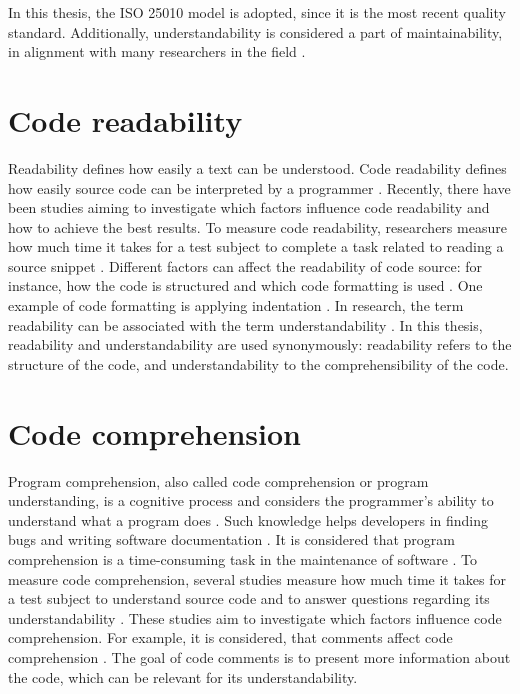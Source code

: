 In this thesis, the ISO 25010 model is adopted, since it is the most recent quality standard. Additionally, understandability is considered a part of maintainability, in alignment with many researchers in the field \cite{xia2017measuring}. 



\section{Code readability}

Readability defines how easily a text can be understood. Code readability defines how easily source code can be interpreted by a programmer \cite{bakhuizen2019comments}.  Recently, there have been studies aiming to investigate which factors influence code readability and how to achieve the best results. 
To measure code readability, researchers measure how much time it takes for a test subject to complete a task related to reading a source snippet  \cite{bakhuizen2019comments}.   Different factors can affect the readability of code source: for instance, how the code is structured and which code formatting is used  \cite{bakhuizen2019comments}.  One example of code formatting is applying indentation \cite{buse2009learning}. In research, the term readability can be associated with the term understandability \cite{winkler2024investigating}. In this thesis, readability and understandability are used synonymously: readability refers to the structure of the code, and understandability to the comprehensibility of the code.


\section{Code comprehension}

Program comprehension, also called code comprehension or program understanding, is a cognitive process and considers the programmer's ability to understand what a program does \cite{karahasanovic2007comprehension}. Such knowledge helps developers in finding bugs and writing software documentation \cite{xia2017measuring}.
It is considered that program comprehension is a time-consuming task in the maintenance of software \cite{8075175}. To measure code comprehension, several studies measure how much time it takes for a test subject to understand source code and to answer questions regarding its understandability \cite{wagner2021code}. These studies aim to investigate which factors influence code comprehension. For example, it is considered, that comments affect code comprehension \cite{de2011comment}. The goal of code comments is to present more information about the code, which can be relevant for its understandability.

